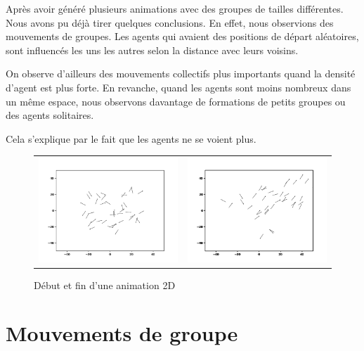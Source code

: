 \documentclass[french, a4paper, 12pt, openany]{report}
\begin{document}
   Après avoir généré plusieurs animations avec des groupes de tailles différentes. Nous avons pu déjà tirer quelques conclusions. En effet, nous observions des mouvements de groupes. Les agents qui avaient des positions de départ aléatoires, sont influencés les uns les autres selon la distance avec leurs voisins.
   
   On observe d'ailleurs des mouvements collectifs plus importants quand la densité d'agent est plus forte. En revanche, quand les agents sont moins nombreux dans un même espace, nous observons davantage de formations de petits groupes ou des agents solitaires. 
   
   Cela s'explique par le fait que les agents ne se voient plus.
   
	\begin{figure}[!h]
		\centering
		\begin{tabular}{cc}
			\includegraphics[width=8cm]{images/image_3.png} & \includegraphics[width=8cm]{images/image_4.png} \\
		\end{tabular}
		\caption{Début et fin d'une animation 2D}
	\end{figure} 
   
   
\section{Mouvements de groupe}
\end{document}
